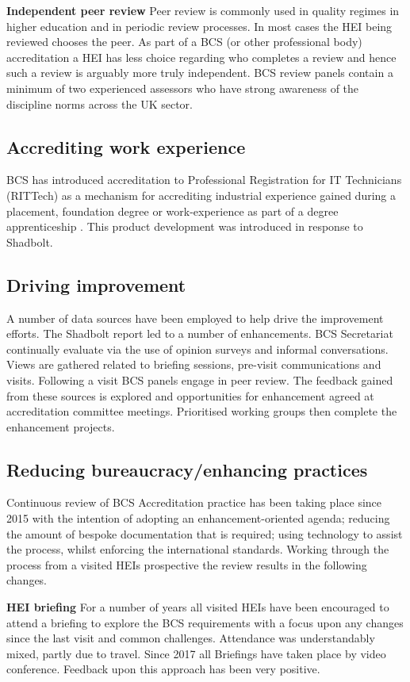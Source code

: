 \documentclass[sigconf]{acmart}
\begin{document}
{\textbf{Independent peer review}}
Peer review is commonly used in quality regimes in higher education and in periodic review processes. In most cases the HEI being reviewed chooses the peer. As part of a BCS (or other professional body) accreditation a HEI has less choice regarding who completes a review and hence such a review is arguably more truly independent. BCS review panels contain a minimum of two experienced assessors who have strong awareness of the discipline norms across the UK sector.
\subsection{Accrediting work experience}
BCS has introduced accreditation to Professional Registration for IT Technicians (RITTech) as a mechanism for accrediting industrial experience gained during a placement, foundation degree or work-experience as part of a degree apprenticeship \cite[p8]{BCS2018a}. This product development was introduced in response to Shadbolt.

\subsection{Driving improvement}
A number of data sources have been employed to help drive the improvement efforts. The Shadbolt report led to a number of enhancements. BCS Secretariat continually evaluate via the use of opinion surveys and informal conversations. Views are gathered related to briefing sessions, pre-visit communications and visits. Following a visit BCS panels engage in peer review. The feedback gained from these sources is explored and opportunities for enhancement agreed at accreditation committee meetings. Prioritised working groups then complete the enhancement projects. 

\subsection{Reducing bureaucracy/enhancing practices}
Continuous review of BCS Accreditation practice has been taking place since 2015 with the intention of adopting an enhancement-oriented agenda; reducing the amount of bespoke documentation that is required; using technology to assist the process, whilst enforcing the international standards. Working through the process from a visited HEIs prospective the review results in the following changes.

{\textbf{HEI briefing}}
For a number of years all visited HEIs have been encouraged to attend a briefing to explore the BCS requirements with a focus upon any changes since the last visit and common challenges. %
Attendance was understandably mixed, partly due to travel. Since 2017 all Briefings have taken place by video conference. Feedback upon this approach has been very positive.
\end{document}
